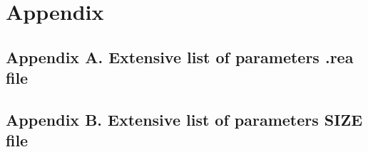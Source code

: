 \documentclass[11pt]{report}              %
\begin{document}
%
\begin{comment}
\chapter{Postprocessing}
\section{Visualisation}

\end{comment} 
\chapter{Appendix}
\section{Appendix A. Extensive list of parameters .rea file}

\section{Appendix B. Extensive list of parameters SIZE file}

%


\renewcommand\refname{References}


\addtolength{\baselineskip}{-.1\baselineskip}

\addtolength{\baselineskip}{+.111111\baselineskip}
\end{document}
